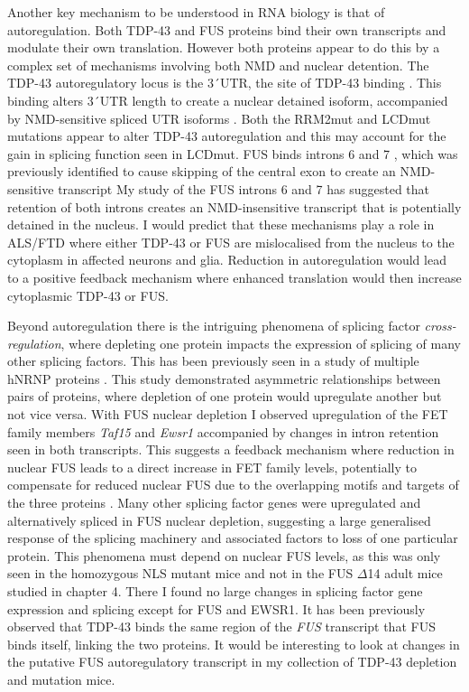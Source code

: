 Another key mechanism to be understood in RNA biology is that of autoregulation.
Both TDP-43 and FUS proteins bind their own transcripts and modulate their own translation.
However both proteins appear to do this by a complex set of mechanisms involving both NMD and nuclear detention.
The TDP-43 autoregulatory locus is the 3\'\ UTR, the site of TDP-43 binding \citep{Polymenidou2011}. 
This binding alters 3\'\ UTR length to create a nuclear detained isoform, accompanied by NMD-sensitive spliced UTR isoforms \citep{Ayala2011,Koyama2016}.
Both the RRM2mut and LCDmut mutations appear to alter TDP-43 autoregulation and this may account for the gain in splicing function seen in LCDmut.
FUS binds introns 6 and 7 \citep{Lagier-Tourenne2012}, which was previously identified to cause skipping of the central exon to create an NMD-sensitive transcript \citep{Zhou2013}
My study of the FUS introns 6 and 7 has suggested that retention of both introns creates an NMD-insensitive transcript that is potentially detained in the nucleus.
I would predict that these mechanisms play a role in ALS/FTD where either TDP-43 or FUS are mislocalised from the nucleus to the cytoplasm in affected neurons and glia.
Reduction in autoregulation would lead to a positive feedback mechanism where enhanced translation would then increase cytoplasmic TDP-43 or FUS.

Beyond autoregulation there is the intriguing phenomena of splicing factor \textit{cross-regulation}, where depleting one protein impacts the expression of splicing of many other splicing factors.
This has been previously seen in a study of multiple hNRNP proteins \citep{Huelga2012}. 
This study demonstrated asymmetric relationships between pairs of proteins, where depletion of one protein would upregulate another but not vice versa.
With FUS nuclear depletion I observed upregulation of the FET family members \textit{Taf15} and \textit{Ewsr1} accompanied by changes in intron retention seen in both transcripts. 
This suggests a feedback mechanism where reduction in nuclear FUS leads to a direct increase in FET family levels, potentially to compensate for reduced nuclear FUS due to the overlapping motifs and targets of the three proteins \citep{Kapeli2016}.
Many other splicing factor genes were upregulated and alternatively spliced in FUS nuclear depletion, suggesting a large generalised response of the splicing machinery and associated factors to loss of one particular protein. 
This phenomena must depend on nuclear FUS levels, as this was only seen in the homozygous NLS mutant mice and not in the FUS $\Delta$14 adult mice studied in chapter 4.
There I found no large changes in splicing factor gene expression and splicing except for FUS and EWSR1.
It has been previously observed that TDP-43 binds the same region of the \textit{FUS} transcript that FUS binds itself, linking the two proteins.
It would be interesting to look at changes in the putative FUS autoregulatory transcript in my collection of TDP-43 depletion and mutation mice.

